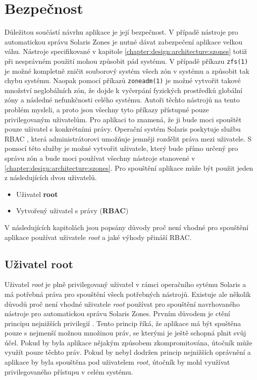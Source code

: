 \section{Bezpečnost}
\label{chapter:design:security}
Důležitou součástí návrhu aplikace je její bezpečnost. V případě nástroje pro automatickou správu Solaris Zones je nutné dávat
zabezpečení aplikace velkou váhu. Nástroje specifikované v kapitole \ref{chapter:design:architecture:szones} totiž při nesprávném
použití mohou způsobit pád systému. V případě příkazu \verb|zfs(1)| je možné kompletně zničit souborový systém všech zón v systému
a způsobit tak chybu systému. Naopak pomocí příkazů \verb|zoneadm(1)| je možné vytvořit takové množství neglobálních zón, že
dojde k vyčerpání fyzických prostředků globální zóny a následné nefunkčnosti celého systému. Autoři těchto nástrojů na tento
problém mysleli, a proto jsou všechny tyto příkazy přístupné pouze privilegovaným uživatelům. Pro aplikaci to znamená, že ji 
bude moci spouštět pouze uživatel s konkrétními právy. Operační systém Solaris poskytuje službu RBAC \cite{oracle:solaris:desing:rbac},
která administrátorovi umožňuje jemněji rozdělit práva mezi uživatele. S pomocí této služby je možné vytvořit uživatele, který bude
přímo určený pro správu zón a bude moci používat všechny nástroje stanovené v \ref{chapter:design:architecture:szones}. Pro spouštění
aplikace může být použit jeden z následujících dvou uživatelů.
\begin{itemize}
 \item Uživatel \textbf{root}
 \item Vytvořený uživatel s právy (\textbf{RBAC})
\end{itemize}
V následujících kapitolách jsou popsány důvody proč není vhodné pro spouštění aplikace používat uživatele \textit{root} a 
jaké výhody přináší RBAC.
\subsection{Uživatel root}
\label{chapter:design:security:root}
Uživatel \textit{root} je plně privilegovaný uživatel v rámci operačního sytému Solaris a má potřebná práva pro spouštění všech
potřebných nástrojů. Existuje ale několik důvodů proč není vhodné uživatele \textit{root} používat pro spouštění navrhovaného
nástroje pro automatickou správu Solaris Zones. Prvním důvodem je ctění principu nejnižších privilegií 
\cite{cvut:presentations:least_user_privilege}. Tento princip říká, že aplikace má být spuštěna pouze s nejmenší možnou množinou
práv, se kterými je ještě schopná plnit svůj účel. Pokud by byla aplikace nějakým způsobem zkompromitována, útočník může využít
pouze těchto práv. Pokud by nebyl dodržen princip nejnižších oprávnění a aplikace by byla spouštěna pod uživatelem \textit{root},
útočník by mohl využívat privilegovaného přístupu v celém systému.

